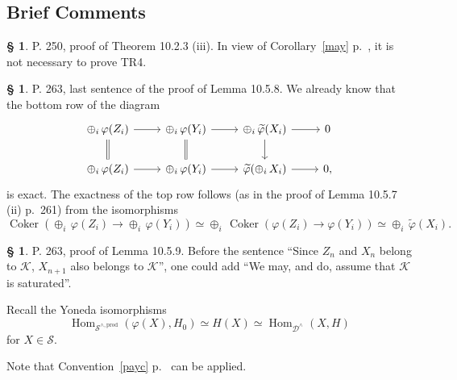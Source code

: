 \documentclass[12pt]{article}%
\theoremstyle{remark}
\theoremstyle{definition}
\newtheorem{s}[thm]{\S}%
\newcommand{\nn}{\noindent}
\newcommand{\cc}{\mathcal}
\DeclareMathOperator{\Coker}{Coker}
\DeclareMathOperator{\Hom}{Hom}%
\begin{document}

\subsection{Brief Comments}

\begin{s} 
P. 250, proof of Theorem 10.2.3 (iii). In view of Corollary~\ref{may} p.~\pageref{may}, it is not necessary to prove TR4.
\end{s}

%


%

\begin{s} P. 263, last sentence of the proof of Lemma 10.5.8. We already know that the bottom row of the diagram 
$$
\begin{tikzcd}
\oplus_i\,\varphi(Z_i)\ar[equal]{d}\ar{r}&\oplus_i\,\varphi(Y_i)\ar[equal]{d}\ar{r}&\oplus_i\,\widetilde\varphi(X_i)\ar{d}\ar{r}&0\\ 
\oplus_i\,\varphi(Z_i)\ar{r}&\oplus_i\,\varphi(Y_i)\ar{r}&\widetilde\varphi(\oplus_i\,X_i)\ar{r}&0,
\end{tikzcd}
$$ 
is exact. The exactness of the top row follows (as in the proof of Lemma 10.5.7 (ii) p.~261) from the isomorphisms 
$$
\Coker(\oplus_i\,\varphi(Z_i)\to\oplus_i\,\varphi(Y_i))\simeq\oplus_i\,\Coker(\varphi(Z_i)\to\varphi(Y_i))\simeq\oplus_i\,\widetilde\varphi(X_i).
$$
\end{s}
%
%
\begin{s} P. 263, proof of Lemma 10.5.9. Before the sentence ``Since $Z_n$ and $X_n$ belong to $\cc K$, $X_{n+1}$ also belongs to $\cc K$'', one could add ``We may, and do, assume that $\cc K$ is saturated''.

Recall the Yoneda isomorphisms 
$$
\Hom_{\cc S^{\wedge,\text{prod}}}(\varphi(X),H_0)\simeq H(X)\simeq\Hom_{\cc D^\wedge}(X,H)
$$ 
for $X\in\cc S$.

Note that Convention~\ref{payc} p.~\pageref{payc} can be applied.
\end{s}
%
%
\end{document}
